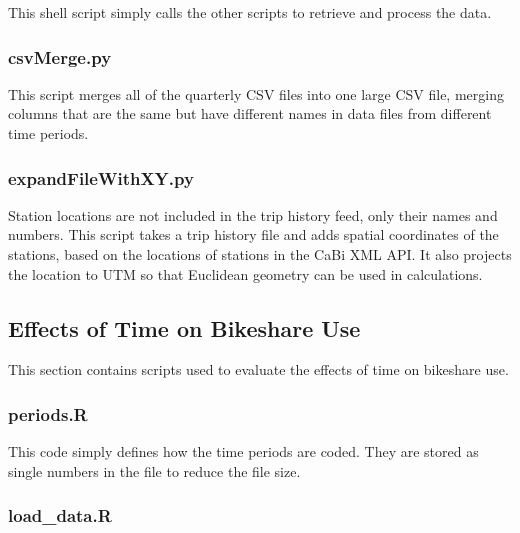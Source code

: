 \documentclass[letterpaper,11pt]{article}
\begin{document}
This shell script simply calls the other scripts to retrieve and
process the data.



\subsubsection{csvMerge.py}
\label{csvMerge.py}

This script merges all of the quarterly CSV files into one large CSV
file, merging columns that are the same but have different names in
data files from different time periods.



\subsubsection{expandFileWithXY.py}
\label{expandFileWithXY.py}

Station locations are not included in the trip history feed, only
their names and numbers. This script takes a trip history file and
adds spatial coordinates of the stations, based on the locations of
stations in the CaBi XML API. It also projects the location to UTM so that
Euclidean geometry can be used in calculations.



\subsection{Effects of Time on Bikeshare Use}

This section contains scripts used to evaluate the effects of time on
bikeshare use.

\subsubsection{periods.R}
\label{periods.R}

This code simply defines how the time periods are coded. They are
stored as single numbers in the file to reduce the file size.



\subsubsection{load\_data.R}
\label{load_data.R}
\end{document}
